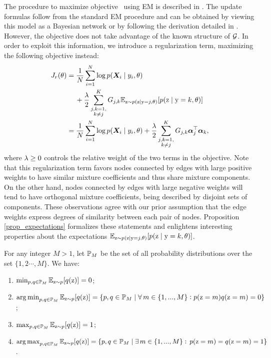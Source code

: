 The procedure to maximize objective~ using EM is described in . The update formulas follow from the standard EM procedure and can be obtained by viewing this model as a Bayesian network or by following the derivation detailed in . However, the objective  does not take advantage of the known structure of ${\mathcal{G}}$. In order to exploit this information, we introduce a regularization term, maximizing the following objective instead:
\begin{align}
\label{objective}
J_r(\theta) &= \frac{1}{N}\sum_{i=1}^N \log p({\bm{X}}_i \mid y_i, \theta) \nonumber\\ 
&\mathbin{\hphantom{=}}{}+ \frac{\lambda}{2} \sum_{\substack{j,k=1,\\k\neq j}}^{K} {G}_{j,k} \mathbb{E}_{{\textnormal{z}} \sim p({\textnormal{z}} \mid {\textnormal{y}}=j, \theta)} [ p({\textnormal{z}} \mid {\textnormal{y}}=k, \theta) ] \nonumber\\
&= \frac{1}{N}\sum_{i=1}^N \log p({\bm{X}}_i \mid y_i, \theta) + \frac{\lambda}{2} \sum_{\substack{j,k=1,\\k\neq j}}^{K} {G}_{j,k} {\bm{\alpha}}_j^\top {\bm{\alpha}}_k,
\end{align}
where $\lambda \geq 0$ controls the relative weight of the two terms in the objective. Note that this regularization term favors nodes connected by edges with large positive weights to have similar mixture coefficients and thus share mixture components. On the other hand, nodes connected by edges with large negative weights will tend to have orthogonal mixture coefficients, being described by disjoint sets of components. These observations agree with our prior assumption that the edge weights express degrees of similarity between each pair of nodes. Proposition \ref{prop_expectations} formalizes these statements and enlightens interesting properties about the expectations $\mathbb{E}_{{\textnormal{z}} \sim p({\textnormal{z}} \mid {\textnormal{y}}=j, \theta)} [ p({\textnormal{z}} \mid {\textnormal{y}}=k, \theta)]$.
\begin{proposition}
	\label{prop_expectations}
	For any integer $M>1$, let ${\mathbb{P}}_M$ be the set of all probability distributions over the set $\{1,2\cdots,M\}$. We have:
	\begin{enumerate}
		\item $\min_{p,q \in {\mathbb{P}}_M} \mathbb{E}_{{\textnormal{z}}\sim p} [ q({\textnormal{z}}) ] = 0$; \label{prop_min}
		\item $\operatorname*{arg\,min}_{p,q \in {\mathbb{P}}_M} \mathbb{E}_{{\textnormal{z}}\sim p} [ q({\textnormal{z}}) ] = \{p,q \in {\mathbb{P}}_M \mid \forall \, m \in \{1,...,M\}: p({\textnormal{z}} = m)q({\textnormal{z}} = m)=0\}$; \label{prop_argmin}
		\item $\max_{p,q \in {\mathbb{P}}_M} \mathbb{E}_{{\textnormal{z}}\sim p} [ q({\textnormal{z}}) ] = 1$; \label{prop_max}
		\item $\operatorname*{arg\,max}_{p,q \in {\mathbb{P}}_M} \mathbb{E}_{{\textnormal{z}}\sim p} [ q({\textnormal{z}}) ] = \{p,q \in {\mathbb{P}}_M \mid \exists \, m \in \{1,...,M\} : \, p({\textnormal{z}} = m)=q({\textnormal{z}} = m)=1\}$ \label{prop_argmax}.
	\end{enumerate}
\end{proposition}
